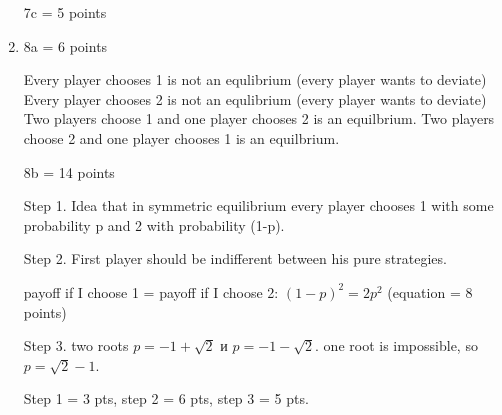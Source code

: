 \begin{enumerate}
7c = 5 points

\item

8a = 6 points


Every player chooses 1 is not an equlibrium (every player wants to deviate)
Every player chooses 2 is not an equlibrium (every player wants to deviate)
Two players choose 1 and one player chooses 2 is an equilbrium.
Two players choose 2 and one player chooses 1 is an equilbrium.

8b = 14 points

Step 1. Idea that in symmetric equilibrium every player chooses 1 with some probability p and 2 with probability (1-p).

Step 2. First player should be indifferent between his pure strategies.

payoff if I choose 1 = payoff if I choose 2:
$(1-p)^2 = 2 p^2$ (equation = 8 points)

Step 3.  two roots $p = -1 + \sqrt{2}$ и $p= - 1 - \sqrt{2}$.
one root is impossible, so $p = \sqrt{2} - 1$.

Step 1 = 3 pts, step 2 = 6 pts, step 3 = 5 pts.
\end{enumerate}
